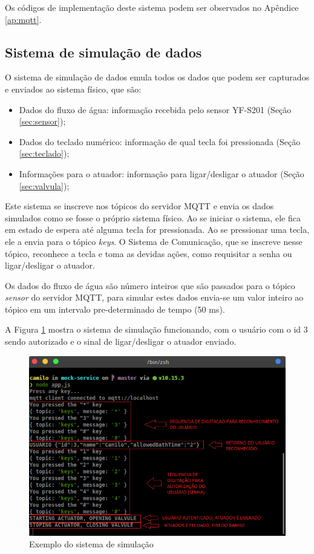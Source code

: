 Os códigos de implementação deste sistema podem ser observados no Apêndice \ref{ap:mqtt}.

\newpage

\subsection{Sistema de simulação de dados} \label{sec:sistemasimulacao}

O sistema de simulação de dados emula todos os dados que podem ser capturados e enviados ao sistema físico, que são:

\begin{itemize}
	\item Dados do fluxo de água: informação recebida pelo sensor YF-S201 (Seção \ref{sec:sensor});
	\item Dados do teclado numérico: informação de qual tecla foi pressionada (Seção \ref{sec:teclado});
	\item Informações para o atuador: informação para ligar/desligar o atuador (Seção \ref{sec:valvula});
\end{itemize}

Este sistema se inscreve nos tópicos do servidor MQTT e envia os dados simulados como se fosse o próprio sistema físico. Ao se iniciar o sistema, ele fica em estado de espera até alguma tecla for pressionada. Ao se pressionar uma tecla, ele a envia para o tópico \textit{keys}. O Sistema de Comunicação, que se inscreve nesse tópico, reconhece a tecla e toma as devidas ações, como requisitar a senha ou ligar/desligar o atuador.

Os dados do fluxo de água são número inteiros que são passados para o tópico \textit{sensor} do servidor MQTT, para simular estes dados envia-se um valor inteiro ao tópico em um intervalo pre-determinado de tempo (50 ms).

A Figura \ref{fig:mockservice} mostra o sistema de simulação funcionando, com o usuário com o id 3 sendo autorizado e o sinal de ligar/desligar o atuador enviado.

\begin{figure}[htbp]
	\centering
	\includegraphics[width=0.6\linewidth]{figuras/mockservice.png}
	\caption{Exemplo do sistema de simulação}
	\label{fig:mockservice}
\end{figure}

